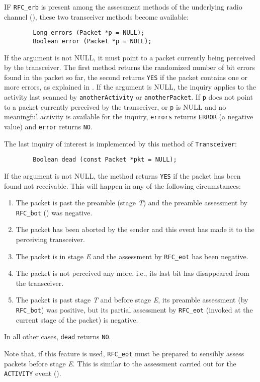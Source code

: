 IF {\tt RFC\_erb} is present among the assessment methods of the underlying
radio channel (), these two transceiver methods
become available:
\begin{verbatim}
        Long errors (Packet *p = NULL);
        Boolean error (Packet *p = NULL);
\end{verbatim}
If the argument is not NULL, it must point to a packet currently being
perceived by the transceiver.
The first method returns the randomized number of bit errors found in the
packet so far, the second returns {\tt YES} if the packet contains one or more
errors, as explained in .
If the argument is NULL, the inquiry applies to the activity last scanned by
{\tt anotherActivity} or {\tt anotherPacket}.
If {\tt p} does not point to a packet currently perceived by the transceiver,
or {\tt p} is NULL and no meaningful activity is available for the inquiry,
{\tt errors} returns {\tt ERROR} (a negative value) and {\tt error} returns
{\tt NO}.

The last inquiry of interest is implemented by this method of
{\tt Transceiver}:
\begin{verbatim}
        Boolean dead (const Packet *pkt = NULL);
\end{verbatim}
\noindent
If the argument is not NULL, the method returns {\tt YES} if the packet has
been found not receivable.
This will happen in any of the following circumstances:
\begin{enumerate}
\item
The packet is past the preamble (stage {\em T\/}) and the preamble assessment
by {\tt RFC\_bot} () was negative.
\item
The packet has been aborted by the sender and this event has made it to
the perceiving transceiver.
\item
The packet is in stage {\em E\/} and the assessment by {\tt RFC\_eot} has
been negative.
\item
The packet is not perceived any more, i.e., its last bit has disappeared from
the transceiver.
\item
The packet is past stage {\em T\/} and before stage {\em E}, its preamble
assessment (by {\tt RFC\_bot}) was positive, but its partial assessment
by {\tt RFC\_eot} (invoked at the current stage of the packet) is negative.
\end{enumerate}
\noindent
In all other cases, {\tt dead} returns {\tt NO}.

Note that, if this feature is used, {\tt RFC\_eot} must be prepared to
sensibly assess packets before stage {\em E}.
This is similar to the assessment carried out for the {\tt ACTIVITY}
event ().

